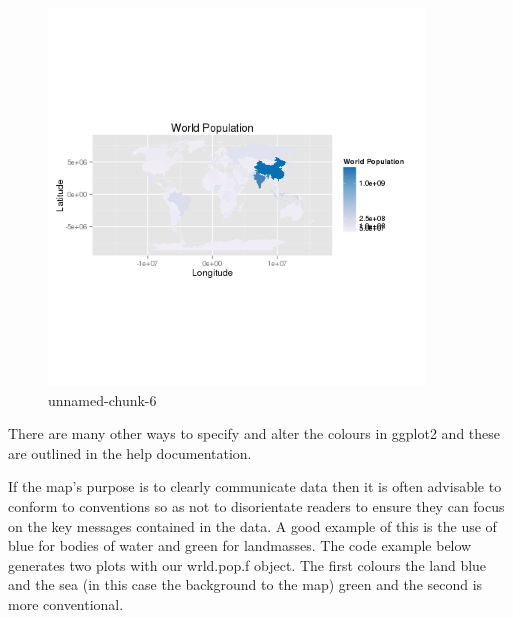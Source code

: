 \documentclass[]{article}
\let\Oldincludegraphics\includegraphics
\renewcommand{\includegraphics}[1]{\Oldincludegraphics[width=10cm]{#1}}
\begin{document}
\begin{figure}[htbp]
\centering
\includegraphics{figure/unnamed-chunk-6.png}
\caption{unnamed-chunk-6}
\end{figure}

There are many other ways to specify and alter the colours in ggplot2
and these are outlined in the help documentation.

If the map's purpose is to clearly communicate data then it is often
advisable to conform to conventions so as not to disorientate readers to
ensure they can focus on the key messages contained in the data. A good
example of this is the use of blue for bodies of water and green for
landmasses. The code example below generates two plots with our
wrld.pop.f object. The first colours the land blue and the sea (in this
case the background to the map) green and the second is more
conventional.
\end{document}
